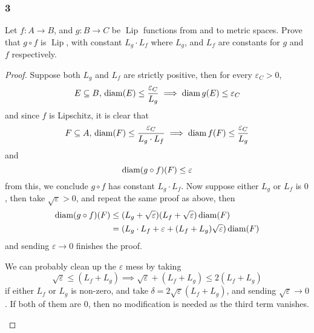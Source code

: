 \documentclass[../main.tex]{subfiles}
\begin{document}
\providecommand{\xn}{\{x_n\}}
\providecommand{\least}{\operatorname{least}}
\providecommand{\lip}{\operatorname{Lip}}
\subsubsection*{3}
\begin{wts}
    Let $f:A\to B$, and $g:B\to C$ be $\lip$ functions from and to metric spaces. Prove that $g\circ f$ is $\lip$, with constant $L_g\cdot L_f$ where $L_g$, and $L_f$ are constants for $g$ and $f$ respectively.
\end{wts}
\begin{proof}
    Suppose both $L_g$ and $L_f$ are strictly positive, then for every $\varepsilon_C>0$, 
    \[E\subseteq B,\,\operatorname{diam}(E)\leq \dfrac{\varepsilon_C}{L_g}\implies \operatorname{diam} g(E)\leq \varepsilon_C\]
    and since $f$ is Lipschitz, it is clear that
    \[F\subseteq A,\,\operatorname{diam}(F)\leq\dfrac{\varepsilon_C}{L_g\cdot L_f}\implies \operatorname{diam} f(F)\leq \dfrac{\varepsilon_C}{L_g}\]
    and
    \[\operatorname{diam} (g\circ f)(F)\leq \varepsilon\]
    from this, we conclude $g\circ f$ has constant $L_g\cdot L_f$. Now suppose either $L_g$ or $L_f$ is $0$, then take $\sqrt{\varepsilon}>0$, and repeat the same proof as above, then
    \begin{align*}\operatorname{diam} (g\circ f) (F)&\leq (L_g + \sqrt{\varepsilon})(L_f + \sqrt{\varepsilon})\operatorname{diam}(F)\\
    &=(L_g\cdot L_f + \varepsilon + (L_f+L_g)\sqrt{\varepsilon})\operatorname{diam}(F)\end{align*}
    and sending $\varepsilon\to 0$ finishes the proof.
    \begin{remark}
        We can probably clean up the $\varepsilon$ mess by taking \[\sqrt{\varepsilon}\leq (L_f + L_g)\implies \sqrt{\varepsilon} + (L_f + L_g)\leq 2(L_f + L_g)\]
        if either $L_f$ or $L_g$ is non-zero, and take $\delta = 2\sqrt{\varepsilon}(L_f+L_g)$, and sending $\sqrt{\varepsilon}\to 0$. If both of them are $0$, then no modification is needed as the third term vanishes.
    \end{remark}
\end{proof}
\end{document}
